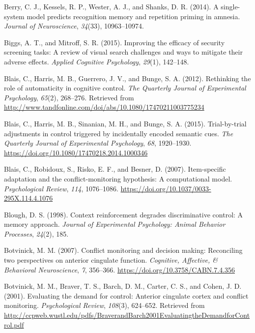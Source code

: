 \documentclass[]{DissertateCUNY}
\begin{document}
\leavevmode\hypertarget{ref-berry_single-system_2014}{}%
Berry, C. J., Kessels, R. P., Wester, A. J., and Shanks, D. R. (2014). A
single-system model predicts recognition memory and repetition priming
in amnesia. \emph{Journal of Neuroscience}, \emph{34}(33), 10963--10974.

\leavevmode\hypertarget{ref-biggs_improving_2015}{}%
Biggs, A. T., and Mitroff, S. R. (2015). Improving the efficacy of
security screening tasks: A review of visual search challenges and ways
to mitigate their adverse effects. \emph{Applied Cognitive Psychology},
\emph{29}(1), 142--148.

\leavevmode\hypertarget{ref-blais_rethinking_2012}{}%
Blais, C., Harris, M. B., Guerrero, J. V., and Bunge, S. A. (2012).
Rethinking the role of automaticity in cognitive control. \emph{The
Quarterly Journal of Experimental Psychology}, \emph{65}(2), 268--276.
Retrieved from
\url{http://www.tandfonline.com/doi/abs/10.1080/17470211003775234}

\leavevmode\hypertarget{ref-blais_trial-by-trial_2015}{}%
Blais, C., Harris, M. B., Sinanian, M. H., and Bunge, S. A. (2015).
Trial-by-trial adjustments in control triggered by incidentally encoded
semantic cues. \emph{The Quarterly Journal of Experimental Psychology},
\emph{68}, 1920--1930.
\url{https://doi.org/10.1080/17470218.2014.1000346}

\leavevmode\hypertarget{ref-blais_item-specific_2007}{}%
Blais, C., Robidoux, S., Risko, E. F., and Besner, D. (2007).
Item-specific adaptation and the conflict-monitoring hypothesis: A
computational model. \emph{Psychological Review}, \emph{114},
1076--1086. \url{https://doi.org/10.1037/0033-295X.114.4.1076}

\leavevmode\hypertarget{ref-blough_context_1998}{}%
Blough, D. S. (1998). Context reinforcement degrades discriminative
control: A memory approach. \emph{Journal of Experimental Psychology:
Animal Behavior Processes}, \emph{24}(2), 185.

\leavevmode\hypertarget{ref-botvinick_conflict_2007}{}%
Botvinick, M. M. (2007). Conflict monitoring and decision making:
Reconciling two perspectives on anterior cingulate function.
\emph{Cognitive, Affective, \& Behavioral Neuroscience}, \emph{7},
356--366. \url{https://doi.org/10.3758/CABN.7.4.356}

\leavevmode\hypertarget{ref-botvinick_evaluating_2001}{}%
Botvinick, M. M., Braver, T. S., Barch, D. M., Carter, C. S., and Cohen,
J. D. (2001). Evaluating the demand for control: Anterior cingulate
cortex and conflict monitoring. \emph{Psychological Review},
\emph{108}(3), 624--652. Retrieved from
\url{http://ccpweb.wustl.edu/pdfs/BraverandBarch2001EvaluatingtheDemandforControl.pdf}
\end{document}
